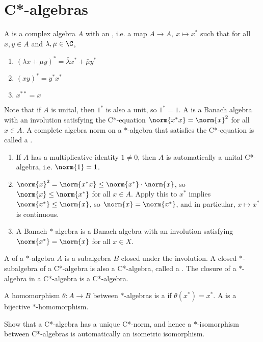 \documentclass[a4paper]{article}
\begin{document}
\newpage

\section{C*-algebras}
A  is a complex algebra $A$ with an , i.e. a map $A\to A,\ x\mapsto x^*$ such that for all $x,y\in A$ and $\lambda,\mu\in\C$,
\begin{enumerate}[label=(\roman*)]
	\item $(\lambda x+\mu y)^*=\bar{\lambda}x^*+\bar{\mu}y^*$
	\item $(xy)^*=y^*x^*$
	\item $x^{**}=x$
\end{enumerate}
Note that if $A$ is unital, then $1^*$ is also a unit, so $1^*=1$. A  is a Banach algebra with an involution satisfying the C*-equation $\norm{x^*x}=\norm{x}^2$ for all $x\in A$. A complete algebra norm on a $*$-algebra that satisfies the C*-equation is called a .

\begin{remark}
	\begin{enumerate}[label=(\arabic*)]
		\item If $A$ has a multiplicative identity $1\not= 0$, then $A$ is automatically a unital C*-algebra, i.e. $\norm{1}=1$.
		\item $\norm{x}^2=\norm{x^*x}\leq\norm{x^*}\cdot\norm{x}$, so $\norm{x}\leq\norm{x^*}$ for all $x\in A$. Apply this to $x^*$ implies $\norm{x^*}\leq\norm{x}$, so $\norm{x}=\norm{x^*}$, and in particular, $x\mapsto x^*$ is continuous.
		\item A Banach $*$-algebra is a Banach algebra with an involution satisfying $\norm{x^*}=\norm{x}$ for all $x\in X$.
	\end{enumerate}
\end{remark}

A  of a $*$-algebra $A$ is a subalgebra $B$ closed under the involution. A closed $*$-subalgebra of a C*-algebra is also a C*-algebra, called a . The closure of a $*$-algebra in a C*-algebra is a C*-algebra.

A homomorphism $\theta:A\to B$ between $*$-algebras is a  if $\theta(x^*)=x^*$. A  is a bijective $*$-homomorphism.

\begin{ex}
  Show that a C*-algebra has a unique C*-norm, and hence a $*$-isomorphism between C*-algebras is automatically an isometric isomorphism.
\end{ex}
\end{document}
